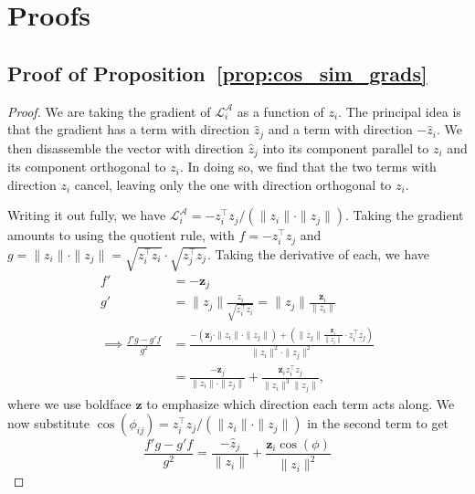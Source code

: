 \renewcommand{\thefigure}{S\arabic{figure}}
\setcounter{figure}{0}  
\renewcommand{\thetable}{S\arabic{table}}
\setcounter{table}{0} 


\section{Proofs}
\subsection{Proof of Proposition~\ref{prop:cos_sim_grads}}
\label{prf:prop_grad_grows}
\cosgrads*
\begin{proof}
    We are taking the gradient of $\mathcal{L}^\mathcal{A}_i$ as a function of $z_i$. The principal idea is that the gradient has a term with direction $\hat{z}_j$ and a term with direction $-\hat{z}_i$. We then disassemble the vector with direction $\hat{z}_j$ into its component parallel to $z_i$ and its component orthogonal to $z_i$. In doing so, we find that the two terms with direction $z_i$ cancel, leaving only the one with direction orthogonal to $z_i$.
    
    Writing it out fully, we have $\mathcal{L}^\mathcal{A}_i = -z_i^\top z_j / (\|z_i\| \cdot \|z_j\|)$. Taking the gradient amounts to using the quotient rule, with $f = -z_i^\top z_j$ and $g = \|z_i\| \cdot \|z_j\| = \sqrt{z_i^\top z_i} \cdot \sqrt{z_j^\top z_j}$. Taking the derivative of each, we have
    \begin{align*}
        f' &= -\mathbf{z}_j \\
        g' &= \|z_j\| \frac{z_i}{\sqrt{z_i^\top z_i}} = \|z_j\| \frac{\mathbf{z}_i}{\|z_i\|} \\
        \implies \frac{f' g - g' f}{g^2} &= \frac{- \left(\mathbf{z}_j \cdot \|z_i\| \cdot \|z_j\| \right) + \left(\|z_j\| \frac{\mathbf{z}_i}{\|z_i\|} \cdot z_i^\top z_j \right)}{\|z_i\|^2 \cdot \|z_j\|^2} \\
        &= \frac{-\mathbf{z}_j}{\|z_i\| \cdot \|z_j\|} + \frac{\mathbf{z}_i z_i^\top z_j}{\|z_i\|^3 \|z_j\|},
    \end{align*}
    where we use boldface $\mathbf{z}$ to emphasize which direction each term acts along. We now substitute $\cos(\phi_{ij}) = z_i^\top z_j / (\|z_i\| \cdot \|z_j\|)$ in the second term to get
    \begin{equation}
        \label{eq:quotient_rule}
        \frac{f' g - g' f}{g^2} = \frac{-\hat{z}_j}{\|z_i\|} + \frac{\mathbf{z}_i \cos(\phi)}{\|z_i\|^2}
    \end{equation}


\end{proof}
